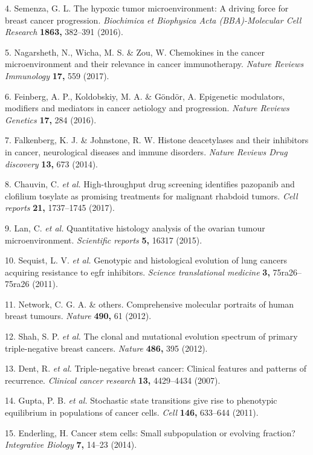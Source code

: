 \documentclass[11pt]{article}
\begin{document}
\leavevmode\hypertarget{ref-BreastMicroEnv}{}%
4. Semenza, G. L. The hypoxic tumor microenvironment: A driving force
for breast cancer progression. \emph{Biochimica et Biophysica Acta
(BBA)-Molecular Cell Research} \textbf{1863,} 382--391 (2016).

\leavevmode\hypertarget{ref-Chemokines}{}%
5. Nagarsheth, N., Wicha, M. S. \& Zou, W. Chemokines in the cancer
microenvironment and their relevance in cancer immunotherapy.
\emph{Nature Reviews Immunology} \textbf{17,} 559 (2017).

\leavevmode\hypertarget{ref-EpigeneticMod}{}%
6. Feinberg, A. P., Koldobskiy, M. A. \& Göndör, A. Epigenetic
modulators, modifiers and mediators in cancer aetiology and progression.
\emph{Nature Reviews Genetics} \textbf{17,} 284 (2016).

\leavevmode\hypertarget{ref-HistoneInhibi}{}%
7. Falkenberg, K. J. \& Johnstone, R. W. Histone deacetylases and their
inhibitors in cancer, neurological diseases and immune disorders.
\emph{Nature Reviews Drug discovery} \textbf{13,} 673 (2014).

\leavevmode\hypertarget{ref-chauvin2017high}{}%
8. Chauvin, C. \emph{et al.} High-throughput drug screening identifies
pazopanib and clofilium tosylate as promising treatments for malignant
rhabdoid tumors. \emph{Cell reports} \textbf{21,} 1737--1745 (2017).

\leavevmode\hypertarget{ref-QuantitativeHistology}{}%
9. Lan, C. \emph{et al.} Quantitative histology analysis of the ovarian
tumour microenvironment. \emph{Scientific reports} \textbf{5,} 16317
(2015).

\leavevmode\hypertarget{ref-GenotypicEGFR}{}%
10. Sequist, L. V. \emph{et al.} Genotypic and histological evolution of
lung cancers acquiring resistance to egfr inhibitors. \emph{Science
translational medicine} \textbf{3,} 75ra26--75ra26 (2011).

\leavevmode\hypertarget{ref-CGANComprehensiveMolecular}{}%
11. Network, C. G. A. \& others. Comprehensive molecular portraits of
human breast tumours. \emph{Nature} \textbf{490,} 61 (2012).

\leavevmode\hypertarget{ref-clonalMutationalEvolution}{}%
12. Shah, S. P. \emph{et al.} The clonal and mutational evolution
spectrum of primary triple-negative breast cancers. \emph{Nature}
\textbf{486,} 395 (2012).

\leavevmode\hypertarget{ref-TNBpatterns}{}%
13. Dent, R. \emph{et al.} Triple-negative breast cancer: Clinical
features and patterns of recurrence. \emph{Clinical cancer research}
\textbf{13,} 4429--4434 (2007).

\leavevmode\hypertarget{ref-Stochasticstatetransitions}{}%
14. Gupta, P. B. \emph{et al.} Stochastic state transitions give rise to
phenotypic equilibrium in populations of cancer cells. \emph{Cell}
\textbf{146,} 633--644 (2011).

\leavevmode\hypertarget{ref-Cancerstemcells}{}%
15. Enderling, H. Cancer stem cells: Small subpopulation or evolving
fraction? \emph{Integrative Biology} \textbf{7,} 14--23 (2014).

\printbibliography
\end{document}
